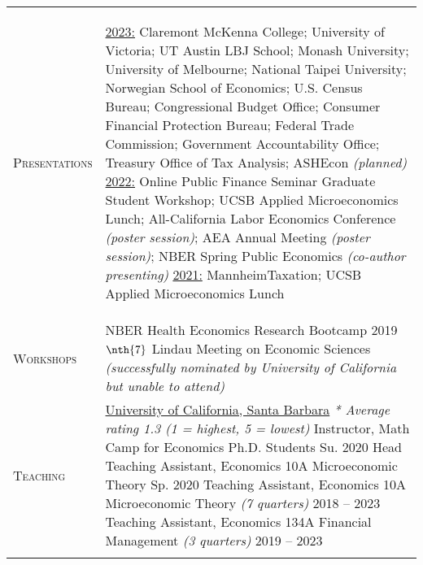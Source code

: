 \documentclass[11pt]{article}
\newcommand{\xspace}{19pt}
\begin{document}
\begin{tabularx}{\textwidth}{@{}Y Z@{}}
	\textsc{Presentations} & 
	\begin{minipage}[t]{1.55\linewidth}	
		\begin{flushleft}
			\uline{2023:} Claremont McKenna College; University of Victoria; UT Austin LBJ School; Monash University; University of Melbourne; National Taipei University; Norwegian School of Economics; U.S. Census Bureau; Congressional Budget Office; Consumer Financial Protection Bureau; Federal Trade Commission; Government Accountability Office; Treasury Office of Tax Analysis; ASHEcon \textit{(planned)}
			\vspace{10pt} \newline
			\uline{2022:} Online Public Finance Seminar Graduate Student Workshop; UCSB Applied Microeconomics Lunch; All-California Labor Economics Conference \textit{(poster session)}; AEA Annual Meeting \textit{(poster session)}; NBER Spring Public Economics \textit{(co-author presenting)}
			\vspace{10pt} \newline
			\uline{2021:} MannheimTaxation; UCSB Applied Microeconomics Lunch
		\end{flushleft}
	\end{minipage}
	\\ \addlinespace[\xspace] 
	
	\textsc{Workshops} & 
	NBER Health Economics Research Bootcamp \hfill 2019%
	\vspace{10pt} \newline
	$\nth{7}$ Lindau Meeting on Economic Sciences \newline \textit{(successfully nominated by University of California but unable to attend)} 
	\\ \addlinespace[\xspace] 
	
	\textsc{Teaching}  & 
	\uline{University of California, Santa Barbara}
	\vspace{3pt} \newline
	\textit{* Average rating 1.3 (1 = highest, 5 = lowest)}
	\vspace{3pt} \newline
	Instructor, Math Camp for Economics Ph.D. Students \hfill Su. 2020%
	\vspace{3pt} \newline
	Head Teaching Assistant, Economics 10A Microeconomic Theory \hfill Sp. 2020%
	\vspace{3pt} \newline
	Teaching Assistant, Economics 10A Microeconomic Theory \textit{(7 quarters)} \hfill 2018 -- 2023%
	\vspace{3pt} \newline
	Teaching Assistant, Economics 134A Financial Management \textit{(3 	quarters)}  \hfill 2019 -- 2023%
	\\ \addlinespace[\xspace] 
	

\end{tabularx}
\end{document}
